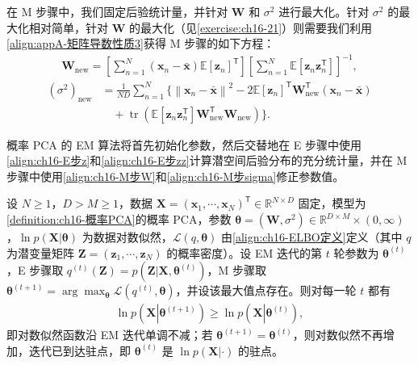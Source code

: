 \documentclass[../../main.tex]{subfiles}
\begin{document}
在 M 步骤中，我们固定后验统计量，并针对 $\bm{W}$ 和 $\sigma^2$ 进行最大化。针对 $\sigma^2$ 的最大化相对简单，针对 $\bm{W}$ 的最大化（见\cref{exercise:ch16-21}）则需要我们利用\eqref{align:appA-矩阵导数性质3}获得 M 步骤的如下方程：
\begin{align}
  \bm{W}_{\text{new}}=\left[\sum_{n=1}^{N}(\bm{x}_n-\bar{\bm{x}})\mathbb{E}[\bm{z}_n]^{\mathsf T}\right]\left[\sum_{n=1}^{N}\mathbb{E}[\bm{z}_n\bm{z}_n^{\mathsf T}]\right]^{-1},
  \label{align:ch16-M步W}
\end{align}
\begin{align}
  \left(\sigma^2\right)_{\text{new}}&=\frac{1}{ND}\sum_{n=1}^{N}\Bigg\{\left\|\bm{x}_n-\bar{\bm{x}}\right\|^2-2\mathbb{E}[\bm{z}_n]^{\mathsf T}\bm{W}_{\text{new}}^{\mathsf T}(\bm{x}_n-\bar{\bm{x}})\nonumber\\
  &\quad+\operatorname{tr}\left(\mathbb{E}[\bm{z}_n\bm{z}_n^{\mathsf T}]\bm{W}_{\text{new}}^{\mathsf T}\bm{W}_{\text{new}}\right)\Bigg\}.
  \label{align:ch16-M步sigma}
\end{align}

概率 PCA 的 EM 算法将首先初始化参数，然后交替地在 E 步骤中使用\eqref{align:ch16-E步z}和\eqref{align:ch16-E步zz}计算潜空间后验分布的充分统计量，并在 M 步骤中使用\eqref{align:ch16-M步W}和\eqref{align:ch16-M步sigma}修正参数值。

\begin{proposition}\label{proposition:ch16-EM单调性}
设 $N\geqslant1$，$D>M\geqslant1$，数据 $\bm{X}=(\bm{x}_1,\cdots,\bm{x}_N)^{\mathsf T}\in\mathbb{R}^{N\times D}$ 固定，模型为\cref{definition:ch16-概率PCA}的概率 PCA，参数 $\bm{\theta}=(\bm{W},\sigma^2)\in\mathbb{R}^{D\times M}\times(0,\infty)$，$\ln p(\bm{X}|\bm{\theta})$ 为数据对数似然，$\mathcal{L}(q,\bm{\theta})$ 由\eqref{align:ch16-ELBO定义}定义（其中 $q$ 为潜变量矩阵 $\bm{Z}=(\bm{z}_1,\cdots,\bm{z}_N)$ 的概率密度）。设 EM 迭代的第 $t$ 轮参数为 $\bm{\theta}^{(t)}$，E 步骤取 $q^{(t)}(\bm{Z})=p(\bm{Z}|\bm{X},\bm{\theta}^{(t)})$，M 步骤取 $\bm{\theta}^{(t+1)}=\arg\max_{\bm{\theta}}\mathcal{L}(q^{(t)},\bm{\theta})$，并设该最大值点存在。则对每一轮 $t$ 都有
\begin{align*}
  \ln p\left(\bm{X}\left|\bm{\theta}^{(t+1)}\right.\right)\geqslant\ln p\left(\bm{X}\left|\bm{\theta}^{(t)}\right.\right),
\end{align*}
即对数似然函数沿 EM 迭代单调不减；若 $\bm{\theta}^{(t+1)}=\bm{\theta}^{(t)}$，则对数似然不再增加，迭代已到达驻点，即 $\bm{\theta}^{(t)}$ 是 $\ln p(\bm{X}|\cdot)$ 的驻点。
\end{proposition}
\end{document}
